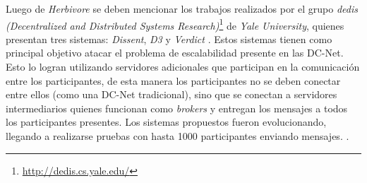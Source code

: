 Luego de \emph{Herbivore} se deben mencionar los trabajos realizados por el grupo \emph{dedis (Decentralized and Distributed Systems Research)}\footnote{\url{http://dedis.cs.yale.edu/}} de \emph{Yale University}, quienes presentan tres sistemas: \emph{Dissent}, \emph{D3} y \emph{Verdict} \cite{corrigan2010dissent, wolinsky2012dissent, wolinsky2012scalable, corrigan2012proactively}. Estos sistemas tienen como principal objetivo atacar el problema de escalabilidad presente en las DC-Net. Esto lo logran utilizando servidores adicionales que participan en la comunicación entre los participantes, de esta manera los participantes no se deben conectar entre ellos (como una DC-Net tradicional), sino que se conectan a servidores intermediarios quienes funcionan como \emph{brokers} y entregan los mensajes a todos los participantes presentes. Los sistemas propuestos fueron evolucionando, llegando a realizarse pruebas con hasta 1000 participantes enviando mensajes. .



